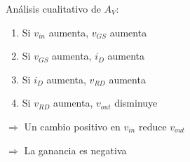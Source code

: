 \begin{frame}[t]
\begin{columns}
\begin{column}{0.65\textwidth}
            \vspace{5mm}

            Análisis cualitativo de $A_V$:

            \begin{enumerate}
                \item Si $v_{in}$ aumenta, $v_{GS}$ aumenta
                \item Si $v_{GS}$ aumenta, $i_D$ aumenta
                \item Si $i_D$ aumenta, $v_{RD}$ aumenta
                \item Si $v_{RD}$ aumenta, $v_{out}$ disminuye
            \end{enumerate}

            $\Rightarrow$ Un cambio positivo en $v_{in}$ reduce $v_{out}$

            $\Rightarrow$ La ganancia es negativa
        \end{column}
    \end{columns}
\end{frame}

